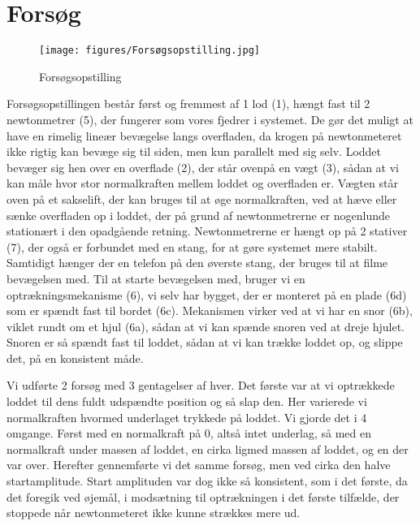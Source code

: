 \chapter{Forsøg}
\begin{figure}[htbp]
    \centering
    \texttt{[image: figures/Forsøgsopstilling.jpg]}
    \caption{Forsøgsopstilling}
\end{figure}
Forsøgsopstillingen består først og fremmest af 1 lod (1), hængt fast til 2 newtonmetrer (5), 
der fungerer som vores fjedrer i systemet. 
De gør det muligt at have en rimelig lineær bevægelse langs overfladen, 
da krogen på newtonmeteret ikke rigtig kan bevæge sig til siden, men kun parallelt med sig selv.
Loddet bevæger sig hen over en overflade (2), der står ovenpå en vægt (3), 
sådan at vi kan måle hvor stor normalkraften mellem loddet og overfladen er.
Vægten står oven på et sakselift, der kan bruges til at øge normalkraften, ved at hæve eller sænke overfladen op i loddet, 
der på grund af newtonmetrerne er nogenlunde stationært i den opadgående retning.
Newtonmetrerne er hængt op på 2 stativer (7), der også er forbundet med en stang, 
for at gøre systemet mere stabilt. Samtidigt hænger der en telefon på den øverste stang, 
der bruges til at filme bevægelsen med.
Til at starte bevægelsen med, bruger vi en optrækningsmekanisme (6), vi selv har bygget, der er monteret på en plade (6d) som er spændt fast til bordet (6c).
Mekanismen virker ved at vi har en snor (6b), viklet rundt om et hjul (6a), sådan at vi kan spænde snoren ved at dreje hjulet. 
Snoren er så spændt fast til loddet, sådan at vi kan trække loddet op, og slippe det, på en konsistent måde.

Vi udførte 2 forsøg med 3 gentagelser af hver. Det første var at vi optrækkede loddet til dens fuldt udspændte position og så slap den. 
Her varierede vi normalkraften hvormed underlaget trykkede på loddet. Vi gjorde det i 4 omgange. Først med en normalkraft på 0, altså intet underlag, så med en normalkraft under massen af loddet, en cirka ligmed massen af loddet, og en der var over.
Herefter gennemførte vi det samme forsøg, men ved cirka den halve startamplitude. Start amplituden var dog ikke så konsistent, som i det første, da det foregik ved øjemål, i modsætning til optrækningen i det første tilfælde, der stoppede når newtonmeteret ikke kunne strækkes mere ud.
